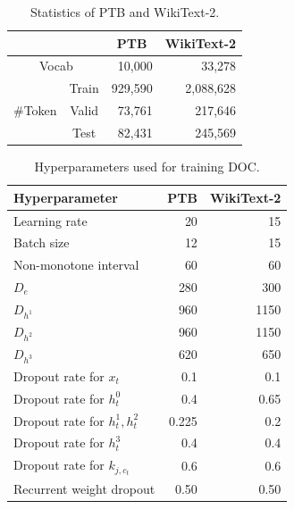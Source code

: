 \documentclass[11pt,a4paper]{article}
\begin{document}
\begin{table}[!t]
  \centering
  \small
  \begin{tabular}{| c c | r | r |} \hline
  \multicolumn{2}{|c|}{} & \multicolumn{1}{c|}{PTB} & \multicolumn{1}{c|}{WikiText-2} \\ \hline
  \multicolumn{2}{|c|}{Vocab} & 10,000 & 33,278 \\ \hline
   & Train & 929,590 & 2,088,628 \\
   \#Token & Valid & 73,761 & 217,646 \\
   & Test & 82,431 & 245,569 \\ \hline
  \end{tabular}
  \caption{Statistics of PTB and WikiText-2.\label{tab:dataset}}
\end{table}


\begin{table}[!t]
  \centering
  \small
  \begin{tabular}{| l | r | r |} \hline
  Hyperparameter & PTB & WikiText-2 \\ \hline
  Learning rate & 20 & 15 \\
  Batch size & 12 & 15 \\
  Non-monotone interval & 60 & 60 \\
  $D_e$ & 280 & 300 \\
  $D_{h^1}$ & 960 & 1150 \\
  $D_{h^2}$ & 960 & 1150 \\
  $D_{h^3}$ & 620 & 650 \\ \hline
  Dropout rate for $x_t$ & 0.1 & 0.1 \\
  Dropout rate for $h^0_t$ & 0.4 & 0.65 \\
  Dropout rate for $h^1_t, h^2_t$ & 0.225 & 0.2 \\
  Dropout rate for $h^3_t$ & 0.4 & 0.4 \\
  Dropout rate for $k_{j, c_t}$ & 0.6 & 0.6 \\
  Recurrent weight dropout & 0.50 & 0.50 \\ \hline
  \end{tabular}
  \caption{Hyperparameters used for training DOC.\label{tab:hyperparameters}}
\end{table}
\end{document}
